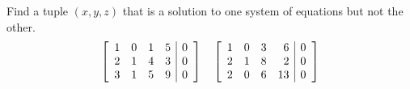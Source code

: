 \begin{enumialphparenastyle}
\begin{ex}
\end{ex}

\begin{ex}
  Find a tuple $(x,y,z)$ that is a solution to one system of equations
  but not the other.
  \begin{equation*}
    \left[
    \begin{array}{rrrr|r}
      1 & 0 & 1 & 5 & 0 \\
      2 & 1 & 4 & 3 & 0 \\
      3 & 1 & 5 & 9 & 0 \\
    \end{array}
    \right]
    \quad
    \left[
    \begin{array}{rrrr|r}
      1 & 0 & 3 & 6 & 0 \\
      2 & 1 & 8 & 2 & 0 \\
      2 & 0 & 6 & 13 & 0 \\
    \end{array}
    \right]
  \end{equation*}    
\end{ex}

\end{enumialphparenastyle}
